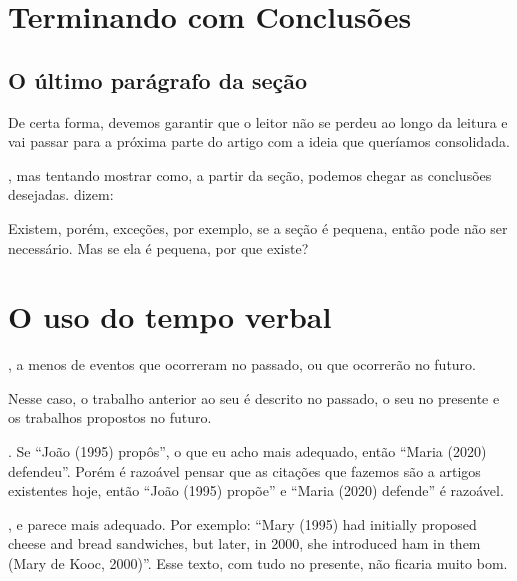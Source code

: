 \documentclass[openany]{book}
\begin{document}
\chapter{Terminando com Conclusões}

\section{O último parágrafo da seção}

  De certa forma, devemos garantir que o leitor não se perdeu ao longo da leitura e vai passar para a próxima parte do artigo com a ideia que queríamos consolidada.

, mas tentando mostrar como, a partir da seção, podemos chegar as conclusões desejadas. \citet{Knuth:1997} dizem:


Existem, porém, exceções, por exemplo, se a seção é pequena, então pode não ser necessário. Mas se ela é pequena, por que existe?


\chapter{O uso do tempo verbal}

, a menos de eventos que ocorreram no passado, ou que ocorrerão no futuro.

 Nesse caso, o trabalho anterior ao seu é descrito no passado, o seu no presente e os trabalhos propostos no futuro.

. Se ``João (1995) propôs'', o que eu acho mais adequado, então ``Maria (2020) defendeu''. Porém é razoável pensar que as citações que fazemos são a artigos existentes hoje, então ``João (1995) propõe'' e ``Maria (2020) defende'' é razoável.

, e parece mais adequado. Por exemplo: ``Mary (1995) had initially proposed cheese and bread sandwiches, but later, in 2000, she introduced ham in them (Mary de Kooc, 2000)''. Esse texto, com tudo no presente, não ficaria muito bom.
\end{document}
